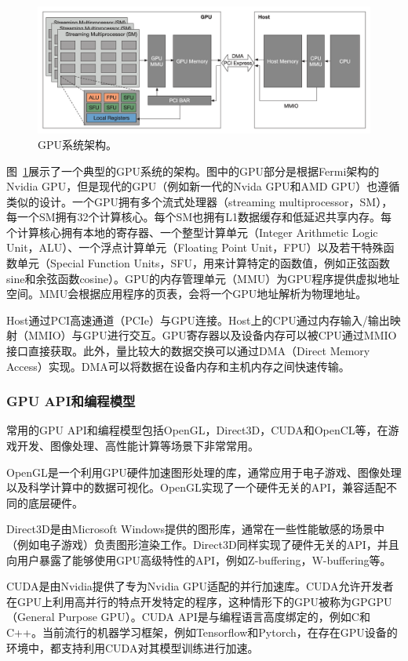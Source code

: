 \begin{figure}[h]
    \centerline{\includegraphics[width=\textwidth]{figures/gpu-arch.png}}
    \caption{GPU系统架构。}
    \label{gpu_arch}
\end{figure}

图~\ref{gpu_arch}展示了一个典型的GPU系统的架构。图中的GPU部分是根据Fermi架构的Nvidia GPU，但是现代的GPU（例如新一代的Nvida GPU和AMD GPU）也遵循类似的设计。一个GPU拥有多个流式处理器（streaming multiprocessor，SM），每一个SM拥有32个计算核心。每个SM也拥有L1数据缓存和低延迟共享内存。每个计算核心拥有本地的寄存器、一个整型计算单元（Integer Arithmetic Logic Unit，ALU）、一个浮点计算单元（Floating Point Unit，FPU）以及若干特殊函数单元（Special Function Units，SFU，用来计算特定的函数值，例如正弦函数sine和余弦函数cosine）。GPU的内存管理单元（MMU）为GPU程序提供虚拟地址空间。MMU会根据应用程序的页表，会将一个GPU地址解析为物理地址。

Host通过PCI高速通道（PCIe）与GPU连接。Host上的CPU通过内存输入/输出映射（MMIO）与GPU进行交互。GPU寄存器以及设备内存可以被CPU通过MMIO接口直接获取。此外，量比较大的数据交换可以通过DMA（Direct Memory Access）实现。DMA可以将数据在设备内存和主机内存之间快速传输。

\subsubsection{GPU API和编程模型}
常用的GPU API和编程模型包括OpenGL，Direct3D，CUDA和OpenCL等，在游戏开发、图像处理、高性能计算等场景下非常常用。

OpenGL是一个利用GPU硬件加速图形处理的库，通常应用于电子游戏、图像处理以及科学计算中的数据可视化。OpenGL实现了一个硬件无关的API，兼容适配不同的底层硬件。

Direct3D是由Microsoft Windows提供的图形库，通常在一些性能敏感的场景中（例如电子游戏）负责图形渲染工作。Direct3D同样实现了硬件无关的API，并且向用户暴露了能够使用GPU高级特性的API，例如Z-buffering，W-buffering等。

CUDA是由Nvidia提供了专为Nvidia GPU适配的并行加速库。CUDA允许开发者在GPU上利用高并行的特点开发特定的程序，这种情形下的GPU被称为GPGPU（General Purpose GPU）。CUDA API是与编程语言高度绑定的，例如C和C++。当前流行的机器学习框架，例如Tensorflow和Pytorch，在存在GPU设备的环境中，都支持利用CUDA对其模型训练进行加速。


